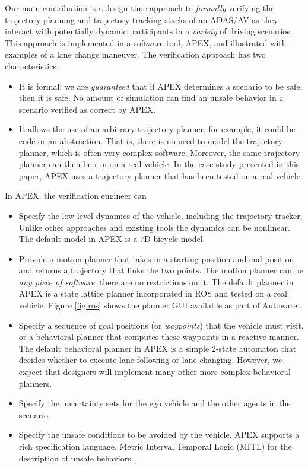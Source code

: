  Our main contribution is a design-time approach to \emph{formally} verifying the trajectory planning and trajectory tracking stacks of an ADAS/AV as they interact with potentially dynamic participants in a \emph{variety} of driving scenarios.
 This approach is implemented in a software tool, APEX, and illustrated with examples of a lane change maneuver.
 The verification approach has two characteristics:
 \vspace{-10pt}
 \begin{itemize}
 	\item It is formal: we are \emph{guaranteed} that if APEX determines a scenario to be safe, then it is safe. 
 	No amount of simulation can find an unsafe behavior in a scenario verified as correct by APEX.
 	\item It allows the use of an arbitrary trajectory planner, for example, it could be code or an abstraction. 
 	That is, there is no need to model the trajectory planner, which is often very complex software.
 	Moreover, the same trajectory planner can then be run on a real vehicle.
 	In the case study presented in this paper, APEX uses a trajectory planner that has been tested on  a real vehicle.	
 \end{itemize}
 In APEX, the verification engineer can
 \vspace{-10pt}
 \begin{itemize}
 	\item Specify the low-level dynamics of the vehicle, including the trajectory tracker. 
 	Unlike other approaches and existing tools the dynamics can be nonlinear. 
 	The default model in APEX is a 7D bicycle model.
 	\item Provide a motion planner that takes in a starting position and end position and returns a trajectory that links the two points.
 	The motion planner can be \emph{any piece of software}: there are no restrictions on it.
 	The default planner in APEX is a state lattice planner incorporated in ROS and tested on a real vehicle. Figure \ref{fig:ros} shows the planner GUI available as part of Autoware
 	\cite{kato}.
 	\item Specify a sequence of goal positions (or \emph{waypoints}) that the vehicle must visit, or a behavioral planner that computes these waypoints in a reactive manner.
 	The default behavioral planner in APEX is a simple 2-state automaton that decides whether to execute lane following or lane changing. However, we expect that designers will implement many other more complex behavioral planners.
 	\item Specify the uncertainty sets for the ego vehicle and the other agents in the scenario.
 	\item Specify the unsafe conditions to be avoided by the vehicle. 
 	APEX supports a rich specification language, Metric Interval Temporal Logic (MITL) for the description of unsafe behaviors \cite{alur91benefits}.
 \end{itemize}
 
